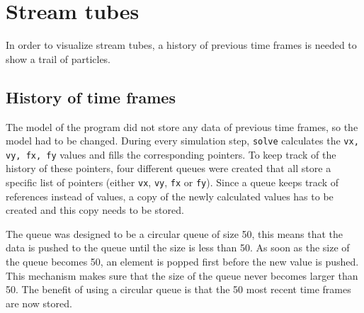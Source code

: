 \section{Stream tubes}
In order to visualize stream tubes, a history of previous time frames is needed to show a trail of particles.

\subsection{History of time frames}
The model of the program did not store any data of previous time frames, so the model had to be changed. 
During every simulation step, \texttt{solve} calculates the \texttt{vx, vy, fx, fy} values and fills the corresponding pointers.
To keep track of the history of these pointers, four different queues were created that all store a specific list of pointers (either \texttt{vx}, \texttt{vy}, \texttt{fx} or \texttt{fy}).
Since a queue keeps track of references instead of values, a copy of the newly calculated values has to be created and this copy needs to be stored.

The queue was designed to be a circular queue of size 50, this means that the data is pushed to the queue until the size is less than 50.
As soon as the size of the queue becomes 50, an element is popped first before the new value is pushed.
This mechanism makes sure that the size of the queue never becomes larger than 50. 
The benefit of using a circular queue is that the 50 most recent time frames are now stored.